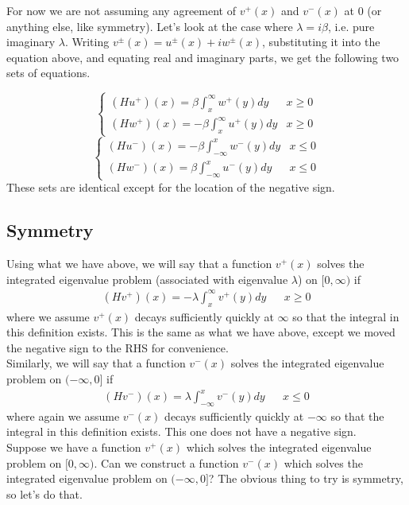 \documentclass[12pt]{article}
\begin{document}
For now we are not assuming any agreement of $v^+(x)$ and $v^-(x)$ at 0 (or anything else, like symmetry). Let's look at the case where $\lambda = i\beta$, i.e. pure imaginary $\lambda$. Writing $v^\pm(x) = u^\pm(x) + i w^\pm(x)$, substituting it into the equation above, and equating real and imaginary parts, we get the following two sets of equations.

\[
\begin{cases}
(Hu^+)(x) =  \beta \int_x^\infty w^+(y) dy & x \geq 0 \\
(Hw^+)(x) = -\beta \int_x^\infty u^+(y) dy & x \geq 0
\end{cases}
\]
\[
\begin{cases}
(Hu^-)(x) = -\beta \int_{-\infty}^x w^-(y) dy & x \leq 0 \\
(Hw^-)(x) = \beta \int_{-\infty}^x  u^-(y) dy & x \leq 0
\end{cases}
\]
These sets are identical except for the location of the negative sign.\\

\subsection*{Symmetry}
Using what we have above, we will say that a function $v^+(x)$ solves the integrated eigenvalue problem (associated with eigenvalue $\lambda$) on $[0,\infty)$ if 
\begin{align*}
(Hv^+)(x) = -\lambda \int_x^\infty v^+(y) dy && x \geq 0
\end{align*}
where we assume $v^+(x)$ decays sufficiently quickly at $\infty$ so that the integral in this definition exists. This is the same as what we have above, except we moved the negative sign to the RHS for convenience.\\

Similarly, we will say that a function $v^-(x)$ solves the integrated eigenvalue problem on $(-\infty, 0]$ if 
\begin{align*}
(Hv^-)(x) = \lambda \int_{-\infty}^x v^-(y) dy && x \leq 0
\end{align*}
where again we assume $v^-(x)$ decays sufficiently quickly at $-\infty$ so that the integral in this definition exists. This one does not have a negative sign. \\

Suppose we have a function $v^+(x)$ which solves the integrated eigenvalue problem on $[0,\infty)$. Can we construct a function $v^-(x)$ which solves the integrated eigenvalue problem on $(-\infty, 0]$? The obvious thing to try is symmetry, so let's do that.
\end{document}

